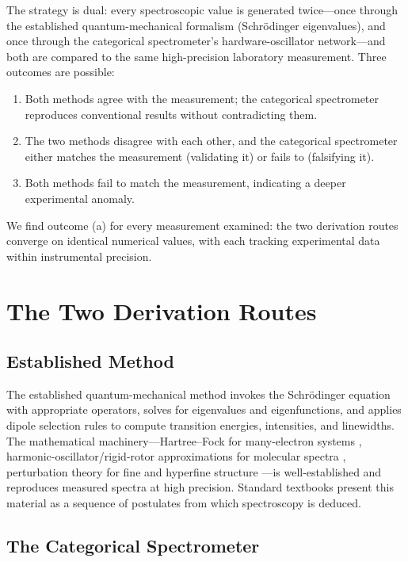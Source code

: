 \documentclass[11pt,a4paper]{article}
\theoremstyle{stmtstyle}
\theoremstyle{definition}
\theoremstyle{remark}
\begin{document}
The strategy is dual: every spectroscopic value is generated twice---once through the established quantum-mechanical formalism (Schr\"odinger eigenvalues), and once through the categorical spectrometer's hardware-oscillator network---and both are compared to the same high-precision laboratory measurement. Three outcomes are possible:
\begin{enumerate}[label=(\alph*)]
\item Both methods agree with the measurement; the categorical spectrometer reproduces conventional results without contradicting them.
\item The two methods disagree with each other, and the categorical spectrometer either matches the measurement (validating it) or fails to (falsifying it).
\item Both methods fail to match the measurement, indicating a deeper experimental anomaly.
\end{enumerate}
We find outcome (a) for every measurement examined: the two derivation routes converge on identical numerical values, with each tracking experimental data within instrumental precision.

\section{The Two Derivation Routes}
\label{sec:routes}

\subsection{Established Method}

The established quantum-mechanical method invokes the Schr\"odinger equation with appropriate operators, solves for eigenvalues and eigenfunctions, and applies dipole selection rules to compute transition energies, intensities, and linewidths. The mathematical machinery---Hartree--Fock for many-electron systems \citep{hartree1928,fock1930}, harmonic-oscillator/rigid-rotor approximations for molecular spectra \citep{wilsondeciuscross1955}, perturbation theory for fine and hyperfine structure \citep{griffiths2018}---is well-established and reproduces measured spectra at high precision. Standard textbooks present this material as a sequence of postulates from which spectroscopy is deduced.

\subsection{The Categorical Spectrometer}
\end{document}

